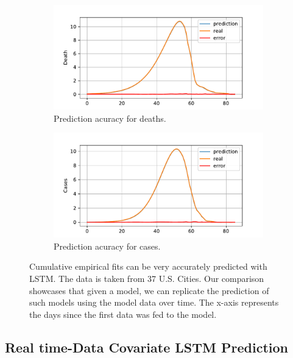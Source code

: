 \documentclass[letterpaper, inpress]{jds} %
\renewcommand{\_}{%
    \textunderscore\hspace{0pt}%
}
\begin{document}
\begin{figure}[!h]
    \centering

    \begin{subfigure}{.49\textwidth}
      \centering
      \includegraphics[width=1.0\linewidth]{images/predict/Fig4a.pdf}  
      \caption{Prediction acuracy for deaths.}
      \label{fig:magic-a}
    \end{subfigure}
    \begin{subfigure}{0.49\textwidth}
      \centering
      \includegraphics[width=1.0\linewidth]{images/predict/Fig4b.pdf}        
      \caption{Prediction acuracy for cases.}
      \label{fig:magic-b}
    \end{subfigure}

    \caption{Cumulative empirical fits can be very accurately
      predicted with LSTM. The data is taken from 37 U.S. Cities. Our
      comparison showcases that given a model, we can replicate the
      prediction of such models using the model data over time. The
      x-axis represents the days since the first data was fed to the
      model.}
    \label{fig:magic-1}
\end{figure}




\subsection{Real time-Data Covariate LSTM Prediction}
\label{sec:lstm-covariate}
\end{document}
